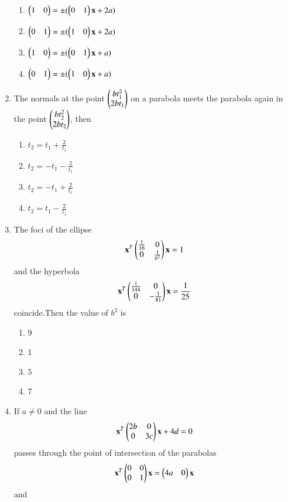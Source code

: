 \documentclass[journal,12pt,twocolumn]{IEEEtran}
\begin{document}
\begin{enumerate}[label=\arabic*]
    \begin{enumerate}
    \item $\begin{pmatrix}1&0\end{pmatrix}=\pm{(\ensuremath{\begin{pmatrix}0&1\end{pmatrix}}\mathbf{x}+2a)}$
    \item $\begin{pmatrix}0&1\end{pmatrix}=\pm{(\ensuremath{\begin{pmatrix}1&0\end{pmatrix}}\mathbf{x}+2a)}$
    \item $\begin{pmatrix}1&0\end{pmatrix}=\pm{(\ensuremath{\begin{pmatrix}0&1\end{pmatrix}}\mathbf{x}+a)}$
    \item $\begin{pmatrix}0&1\end{pmatrix}=\pm{(\ensuremath{\begin{pmatrix}1&0\end{pmatrix}}\mathbf{x}+a)}$
    \end{enumerate}
    \item The normals at the point $\begin{pmatrix}bt_1^2\\2bt_1\end{pmatrix}$ on a parabola meets the parabola again in the point $\begin{pmatrix}bt_2^2\\2bt_2\end{pmatrix}$, then
    \begin{enumerate}
    \item $t_2=t_1+\frac{2}{t_1}$
    \item $t_2=-t_1-\frac{2}{t_1}$
    \item $t_2=-t_1+\frac{2}{t_1}$
    \item $t_2=t_1-\frac{2}{t_1}$
    \end{enumerate}
    \item The foci of the ellipse
    \begin{align}
    \mathbf{x}^T\begin{pmatrix}\frac{1}{16}&0\\0&\frac{1}{b^2}\end{pmatrix}\mathbf{x}=1 
    \end{align}and the hyperbola
    \begin{align}
    \mathbf{x}^T\begin{pmatrix}\frac{1}{144}&0\\0&-\frac{1}{81}\end{pmatrix}\mathbf{x}=\frac{1}{25}
    \end{align} coincide.Then the value of $b^2$ is
    \begin{enumerate}
    \item 9
    \item 1
    \item 5
    \item 7
    \end{enumerate}
    \item If $a\neq0$ and the line
    \begin{align}
    \mathbf{x}^T\begin{pmatrix}2b&0\\0&3c\end{pmatrix}\mathbf{x}+4d=0
    \end{align} passes through the point of intersection of the parabolas
    \begin{align}
    \mathbf{x}^T\begin{pmatrix}0&0\\0&1\end{pmatrix}\mathbf{x}=\begin{pmatrix}4a&0\end{pmatrix}\mathbf{x}
    \end{align}and

\end{enumerate}
\end{document}
